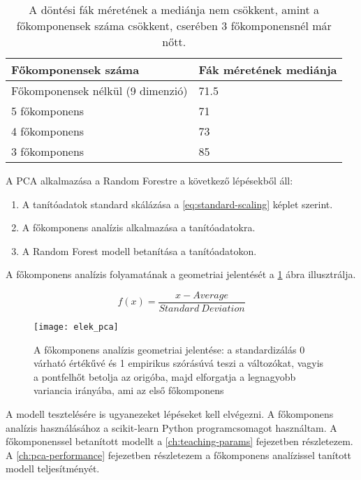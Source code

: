\begin{table}[H]
	\centering
	\begin{tabular}{ | p{} | p{} | }
		\hline
		\textbf{Főkomponensek száma} & \textbf{Fák méretének mediánja} \\
		\hline \hline
		Főkomponensek nélkül (9 dimenzió) & 71.5 \\
		\hline
    5 főkomponens & 71 \\
		\hline
		4 főkomponens & 73\\
		\hline
    3 főkomponens & 85 \\
    \hline
	\end{tabular}
	\caption{A döntési fák méretének a mediánja nem csökkent, amint a főkomponensek száma csökkent, cserében 3 főkomponensnél már nőtt.}
	\label{tab:increase-in-model-size}
\end{table}

A PCA alkalmazása a Random Forestre a következő lépésekből áll:
\begin{enumerate}
	\item A tanítóadatok standard skálázása a \ref{eq:standard-scaling} képlet szerint.
	\item A főkomponens analízis alkalmazása a tanítóadatokra.
	\item A Random Forest modell betanítása a tanítóadatokon.
\end{enumerate}
A főkomponens analízis folyamatának a geometriai jelentését a \ref{fig:elek-pca} ábra illusztrálja.

\begin{equation}\label{eq:standard-scaling}
  f(x) = \frac{x - Average}{Standard \ Deviation}
\end{equation}

\begin{figure}[H]
	\centering
	\texttt{[image: elek\_pca]}
	\caption{A főkomponens analízis geometriai jelentése: a standardizálás 0 várható értékűvé és
  1 empirikus szórásúvá teszi a változókat, vagyis a pontfelhőt betolja az origóba,
  majd elforgatja a legnagyobb variancia irányába, ami az első főkomponens \cite{elek2011}}
    \label{fig:elek-pca}
\end{figure}

A modell tesztelésére is ugyanezeket lépéseket kell elvégezni. A főkomponens analízis használásához a scikit-learn \cite{scikit-learn} Python programcsomagot használtam. A főkomponenssel betanított modellt a \ref{ch:teaching-params} fejezetben részletezem. A \ref{ch:pca-performance} fejezetben részletezem a főkomponens analízissel tanított modell teljesítményét.


